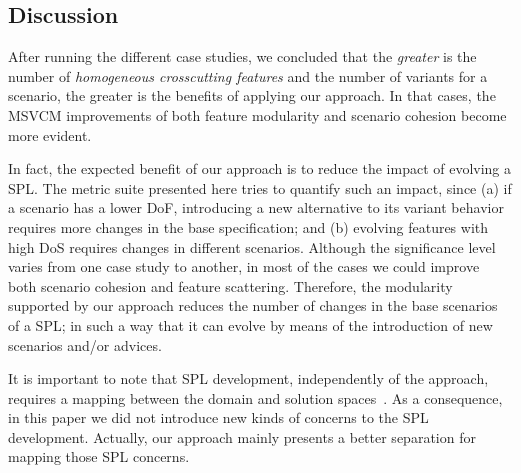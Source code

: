 \subsection{Discussion}

After running the different case studies, we concluded that the 
\emph{greater} is the number of \emph{homogeneous crosscutting features} and
the number of variants for a scenario, the greater is the 
benefits of applying our approach. In that cases, the MSVCM improvements of 
both feature modularity and scenario cohesion become more evident. 

In fact, the expected benefit of our approach is to reduce the impact of evolving
a SPL. The metric suite presented here tries to quantify such an impact, since
(a) if a scenario has a lower DoF, introducing a new alternative to its variant
behavior requires more changes in the base specification; and (b) evolving
features with high DoS requires changes in different scenarios. Although the
significance level varies from one case study to another, in most of the cases we
could improve both scenario cohesion and feature scattering. Therefore, the
modularity supported by our approach reduces the number of changes in the base
scenarios of a SPL; in such a way that it can evolve by means of the
introduction of new scenarios and/or advices.

It is important to note that SPL development, independently of the approach, requires a
mapping between the domain and solution spaces~\cite{Czarnecki:2000aa,Jayaraman:2007aa}. As a
consequence, in this paper we did not introduce new kinds of concerns to the SPL
development. Actually, our approach mainly presents a better separation for
mapping those SPL concerns. 


